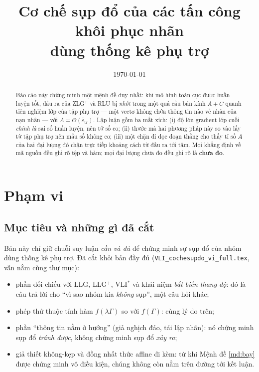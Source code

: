\documentclass[11pt,a4paper]{article}
\title{Cơ chế sụp đổ của các tấn công khôi phục nhãn\\[0.3em]
\large dùng thống kê phụ trợ}
\author{}
\date{\today}
\theoremstyle{remark}
\newcommand{\epstr}{\bar\varepsilon_{\mathrm{tr}}}
\newcommand{\code}[1]{\texttt{\small #1}}
\begin{document}
\maketitle

\begin{abstract}
Báo cáo này chứng minh một mệnh đề duy nhất: khi mô hình toàn cục được huấn
luyện tốt, đầu ra của ZLG$^+$ và RLU bị \emph{nhốt} trong một quả cầu bán
kính $A+C$ quanh tiên nghiệm lớp của tập phụ trợ --- một vectơ không chứa
thông tin nào về nhãn của nạn nhân --- với $A=\Theta(\epstr)$. Lập luận gồm
ba mắt xích: (i) độ lớn gradient lớp cuối \emph{chính là} sai số huấn luyện,
nên tử số co; (ii) thước mà hai phương pháp này so vào lấy từ tập phụ trợ nên
mẫu số không co; (iii) một chặn đi dọc đoạn thẳng cho thấy tỉ số $A$ của hai
đại lượng đó chặn trực tiếp khoảng cách từ đầu ra tới tâm. Mọi khẳng định về
mã nguồn đều ghi rõ tệp và hàm; mọi đại lượng chưa đo đều ghi rõ là
\textbf{chưa đo}.
\end{abstract}

\tableofcontents

\section{Phạm vi}
\label{sec:pham-vi}

\subsection{Mục tiêu và những gì đã cắt}

Bản này chỉ giữ chuỗi suy luận \emph{cần và đủ} để chứng minh sự sụp đổ của
nhóm dùng thống kê phụ trợ. Đã cắt khỏi bản đầy đủ
(\code{VLI\_cochesupdo\_vi\_full.tex}, vẫn nằm cùng thư mục):

\begin{itemize}
\item phần đối chiếu với LLG, LLG$^+$, VLI$^*$ và khái niệm \emph{bất biến
  thang độ}: đó là câu trả lời cho ``vì sao nhóm kia \emph{không} sụp'', một
  câu hỏi khác;
\item phép thử thuộc tính hàm $f(\lambda\Gamma)$ so với $f(\Gamma)$: cùng lý
  do trên;
\item phần ``thông tin nằm ở hướng'' (giả nghịch đảo, tái lập nhãn): nó chứng
  minh sụp đổ \emph{tránh được}, không chứng minh sụp đổ \emph{xảy ra};
\item giả thiết không-kẹp và đồng nhất thức affine đi kèm: từ khi Mệnh đề
  \ref{md:bay} được chứng minh vô điều kiện, chúng không còn nằm trên đường
  tới kết luận.
\end{itemize}
\end{document}
